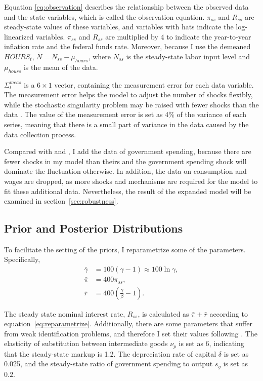 Equation \eqref{eq:observation} describes the relationship between the observed data and the state variables, which is called the observation equation. $\pi_{ss}$ and $R_{ss}$ are steady-state values of these variables, and variables with hats indicate the log-linearized variables. $\pi_{ss}$ and $R_{ss}$ are multiplied by 4 to indicate the year-to-year inflation rate and the federal funds rate. Moreover, because I use the demeaned $HOURS_t$, $\bar{N} = N_{ss} - \mu_{hours}$, where $N_{ss}$ is the steady-state labor input level and $\mu_{hours}$ is the mean of the data.

$\Sigma^{meas}_t$ is a $6 \times 1$ vector, containing the measurement error for each data variable. The measurement error helps the model to adjust the number of shocks flexibly, while the stochastic singularity problem may be raised with fewer shocks than the data \citep{ruge-murciaMethodsEstimateDynamic2007}. The value of the measurement error is set as 4\% of the variance of each series, meaning that there is a small part of variance in the data caused by the data collection process.

Compared with \cite{smetsShocksFrictionsUS2007} and \cite{justinianoInvestmentShocksBusiness2010}, I add the data of government spending, because there are fewer shocks in my model than theirs and the government spending shock will dominate the fluctuation otherwise. In addition, the data on consumption and wages are dropped, as more shocks and mechanisms are required for the model to fit these additional data. Nevertheless, the result of the expanded model will be examined in section~\ref{sec:robustness}.

\subsection{Prior and Posterior Distributions}
\label{sec:estimation:dist}
To facilitate the setting of the priors, I reparametrize some of the parameters. Specifically,
\begin{equation}
    \label{eq:reparametrize}
    \begin{aligned}
        \bar{\gamma} &= 100(\gamma - 1) \approx 100\ln\gamma,\\
        \bar{\pi} &= 400\pi_{ss},\\
        \bar{r} &= 400\left(\frac{\gamma}{\beta} - 1\right).
    \end{aligned}
\end{equation}

The steady state nominal interest rate, $R_{ss}$, is calculated as $\bar{\pi} + \bar{r}$ according to equation~\eqref{eq:reparametrize}. Additionally, there are some parameters that suffer from weak identification problems, and therefore I set their values following \cite{smetsShocksFrictionsUS2007,leeperDynamicsFiscalFinancing2010,nireiOriginsPropagationAnimal}. The elasticity of substitution between intermediate goods $\nu_p$ is set as 6, indicating that the steady-state markup is 1.2. The depreciation rate of capital $\delta$ is set as 0.025, and the steady-state ratio of government spending to output $s_g$ is set as $0.2$.

